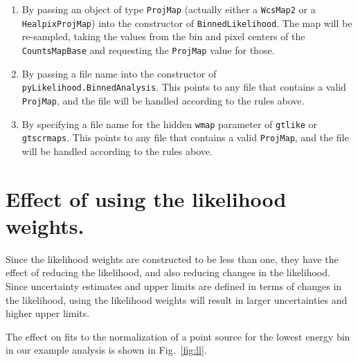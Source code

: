 \documentclass[preprint]{aastex}
\begin{document}
\begin{enumerate}
\item{By passing an object of type {\tt ProjMap} (actually either a
    {\tt WcsMap2} or a {\tt HealpixProjMap}) into the constructor of
    {\tt BinnedLikelihood}.  The map will be re-sampled, taking the
    values from the bin and pixel centers of the {\tt CountsMapBase}
    and requesting the {\tt ProjMap} value for those.}
\item{By passing a file name into the constructor of {\tt
      pyLikelihood.BinnedAnalysis}.  This points to any file that
    contains a valid {\tt ProjMap}, and the file will be handled
    according to the rules above.}
\item{By specifying a file name for the hidden {\tt wmap} parameter of
    {\tt gtlike} or {\tt gtscrmaps}.  This points to any file that
    contains a valid {\tt ProjMap}, and the file will be handled
    according to the rules above.}
\end{enumerate}


\section{Effect of using the likelihood weights.}

Since the likelihood weights are constructed to be less than one, they 
have the effect of reducing the likelihood, and also reducing changes in 
the likelihood.  Since uncertainty estimates and upper limits are defined
in terms of changes in the likelihood, using the likelihood weights 
will result in larger uncertainties and higher upper limits.  

The effect on fits to the normalization of a point source
for the lowest energy bin in our example analysis is shown in Fig.~\ref{fig:ll}.
\end{document}
